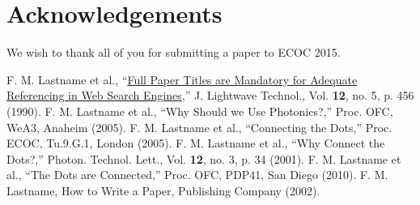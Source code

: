 \documentclass[a4paper, oneside, twocolumn, notitlepage, 10pt]{style/extarticle_ecoc2015}
\begin{document}
\section{Acknowledgements}

We wish to thank all of you for submitting a paper to ECOC 2015.



\begin{spacing}{1.35}
\begin{thebibliography}{1}
F. M. Lastname et al., ``\uline{Full Paper Titles are Mandatory for Adequate Referencing in Web Search Engines},'' J. Lightwave Technol., Vol. {\bf 12}, no. 5, p. 456 (1990).
F. M. Lastname et al., ``Why Should we Use Photonics?,'' Proc. OFC, WeA3, Anaheim (2005).
F. M. Lastname et al., ``Connecting the Dots,'' Proc. ECOC, Tu.9.G.1, London (2005).
F. M. Lastname et al., ``Why Connect the Dots?,'' Photon. Technol. Lett., Vol. {\bf 12}, no. 3, p. 34 (2001).
F. M. Lastname et al., ``The Dots are Connected,'' Proc. OFC, PDP41, San Diego (2010).
F. M. Lastname, How to Write a Paper, Publishing Company (2002). 
\end{thebibliography}
\end{spacing}
\vspace{-4mm}

\end{document}
